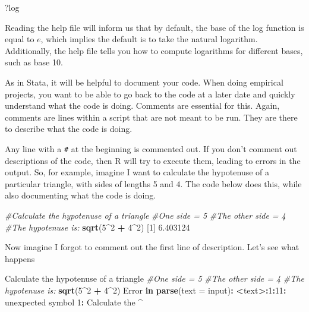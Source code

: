 \documentclass[
]{book}
\newenvironment{Shaded}{\begin{snugshade}}{\end{snugshade}}
\newcommand{\AttributeTok}[1]{\textcolor[rgb]{0.13,0.29,0.53}{#1}}
\newcommand{\CommentTok}[1]{\textcolor[rgb]{0.56,0.35,0.01}{\textit{#1}}}
\newcommand{\ControlFlowTok}[1]{\textcolor[rgb]{0.13,0.29,0.53}{\textbf{#1}}}
\newcommand{\DecValTok}[1]{\textcolor[rgb]{0.00,0.00,0.81}{#1}}
\newcommand{\ErrorTok}[1]{\textcolor[rgb]{0.64,0.00,0.00}{\textbf{#1}}}
\newcommand{\FloatTok}[1]{\textcolor[rgb]{0.00,0.00,0.81}{#1}}
\newcommand{\FunctionTok}[1]{\textcolor[rgb]{0.13,0.29,0.53}{\textbf{#1}}}
\newcommand{\NormalTok}[1]{#1}
\newcommand{\SpecialCharTok}[1]{\textcolor[rgb]{0.81,0.36,0.00}{\textbf{#1}}}
\begin{document}
\begin{Shaded}
\begin{Highlighting}[]
\NormalTok{?log}
\end{Highlighting}
\end{Shaded}

Reading the help file will inform us that by default, the base of the log function is equal to \(e\), which implies the default is to take the natural logarithm. Additionally, the help file tells you how to compute logarithms for different bases, such as base 10.

As in Stata, it will be helpful to document your code. When doing empirical projects, you want to be able to go back to the code at a later date and quickly understand what the code is doing. Comments are essential for this. Again, comments are lines within a script that are not meant to be run. They are there to describe what the code is doing.

Any line with a \texttt{\#} at the beginning is commented out. If you don't comment out descriptions of the code, then R will try to execute them, leading to errors in the output. So, for example, imagine I want to calculate the hypotenuse of a particular triangle, with sides of lengths 5 and 4. The code below does this, while also documenting what the code is doing.

\begin{Shaded}
\begin{Highlighting}[]
\CommentTok{\#Calculate the hypotenuse of a triangle}
\CommentTok{\#One side = 5}
\CommentTok{\#The other side = 4}
\CommentTok{\#The hypotenuse is:}
\FunctionTok{sqrt}\NormalTok{(}\DecValTok{5}\SpecialCharTok{\^{}}\DecValTok{2} \SpecialCharTok{+} \DecValTok{4}\SpecialCharTok{\^{}}\DecValTok{2}\NormalTok{)}
\NormalTok{[}\DecValTok{1}\NormalTok{] }\FloatTok{6.403124}
\end{Highlighting}
\end{Shaded}

Now imagine I forgot to comment out the first line of description. Let's see what happens

\begin{Shaded}
\begin{Highlighting}[]
\NormalTok{Calculate the hypotenuse of a triangle}
\CommentTok{\#One side = 5}
\CommentTok{\#The other side = 4}
\CommentTok{\#The hypotenuse is:}
\FunctionTok{sqrt}\NormalTok{(}\DecValTok{5}\SpecialCharTok{\^{}}\DecValTok{2} \SpecialCharTok{+} \DecValTok{4}\SpecialCharTok{\^{}}\DecValTok{2}\NormalTok{)}
\NormalTok{Error }\ControlFlowTok{in} \FunctionTok{parse}\NormalTok{(}\AttributeTok{text =}\NormalTok{ input)}\SpecialCharTok{:} \ErrorTok{\textless{}}\NormalTok{text}\SpecialCharTok{\textgreater{}}\ErrorTok{:}\DecValTok{1}\SpecialCharTok{:}\DecValTok{11}\SpecialCharTok{:}\NormalTok{ unexpected symbol}
\DecValTok{1}\SpecialCharTok{:}\NormalTok{ Calculate the}
              \SpecialCharTok{\^{}}
\end{Highlighting}
\end{Shaded}
\end{document}
